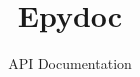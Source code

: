 \documentclass{article}
\begin{document}



\title{Epydoc}
\author{API Documentation}
\maketitle


\addtolength{\parskip}{-2ex}
\tableofcontents
\addtolength{\parskip}{2ex}





\printindex


\end{document}
